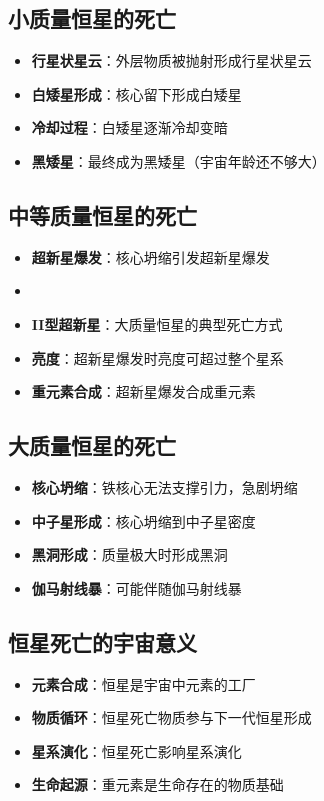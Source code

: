 \documentclass[12pt,UTF8]{ctexbook}
\begin{document}
\subsection{小质量恒星的死亡}

\begin{itemize}
  \item \textbf{行星状星云}：外层物质被抛射形成行星状星云
  \item \textbf{白矮星形成}：核心留下形成白矮星
  \item \textbf{冷却过程}：白矮星逐渐冷却变暗
  \item \textbf{黑矮星}：最终成为黑矮星（宇宙年龄还不够大）
\end{itemize}

\subsection{中等质量恒星的死亡}

\begin{itemize}
  \item \textbf{超新星爆发}：核心坍缩引发超新星爆发
  \item \item \textbf{II型超新星}：大质量恒星的典型死亡方式
  \item \textbf{亮度}：超新星爆发时亮度可超过整个星系
  \item \textbf{重元素合成}：超新星爆发合成重元素
\end{itemize}

\subsection{大质量恒星的死亡}

\begin{itemize}
  \item \textbf{核心坍缩}：铁核心无法支撑引力，急剧坍缩
  \item \textbf{中子星形成}：核心坍缩到中子星密度
  \item \textbf{黑洞形成}：质量极大时形成黑洞
  \item \textbf{伽马射线暴}：可能伴随伽马射线暴
\end{itemize}

\subsection{恒星死亡的宇宙意义}

\begin{itemize}
  \item \textbf{元素合成}：恒星是宇宙中元素的工厂
  \item \textbf{物质循环}：恒星死亡物质参与下一代恒星形成
  \item \textbf{星系演化}：恒星死亡影响星系演化
  \item \textbf{生命起源}：重元素是生命存在的物质基础
\end{itemize}
\end{document}
